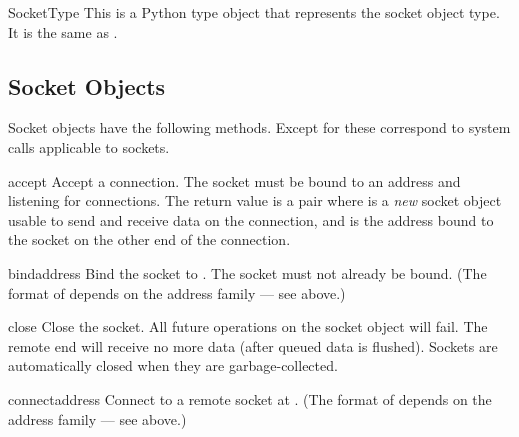 \begin{datadesc}{SocketType}
This is a Python type object that represents the socket object type.
It is the same as .
\end{datadesc}


\begin{seealso}
\end{seealso}


\subsection{Socket Objects \label{socket-objects}}

Socket objects have the following methods.  Except for
 these correspond to \UNIX{} system calls
applicable to sockets.

\begin{methoddesc}[socket]{accept}{}
Accept a connection.
The socket must be bound to an address and listening for connections.
The return value is a pair 
where  is a \emph{new} socket object usable to send and
receive data on the connection, and  is the address bound
to the socket on the other end of the connection.
\end{methoddesc}

\begin{methoddesc}[socket]{bind}{address}
Bind the socket to .  The socket must not already be bound.
(The format of  depends on the address family --- see
above.)  
\end{methoddesc}

\begin{methoddesc}[socket]{close}{}
Close the socket.  All future operations on the socket object will fail.
The remote end will receive no more data (after queued data is flushed).
Sockets are automatically closed when they are garbage-collected.
\end{methoddesc}

\begin{methoddesc}[socket]{connect}{address}
Connect to a remote socket at .
(The format of  depends on the address family --- see
above.)  
\end{methoddesc}

